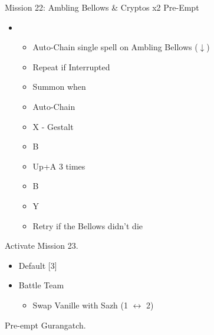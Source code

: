 	\begin{battle}[0:26]{Mission 22: Ambling Bellows \& Cryptos x2 Pre-Empt}
		\begin{itemize}
			\item \second
			      \begin{itemize}
				      \item Auto-Chain single spell on Ambling Bellows ($\downarrow$)
				      \item Repeat if Interrupted
				      \item Summon when \stagger\
				      \item Auto-Chain
				      \item X - Gestalt
				      \item B
				      \item Up+A 3 times
				      \item B
				      \item Y
				      \item Retry if the Bellows didn't die
			      \end{itemize}
		\end{itemize}
	\end{battle}

Activate Mission 23.

\begin{menu}
	\begin{itemize}
		\paradigm
		\begin{itemize}
			\item Default [3]
			\item Battle Team
				\begin{itemize}
					\item Swap Vanille with Sazh (1 $\leftrightarrow$ 2)
				\end{itemize}						      			      	
		\end{itemize}
	\end{itemize}
\end{menu}

\renewcommand{\second}{[2] Relentless Assault (\com/\rav/\rav)}

Pre-empt Gurangatch.

